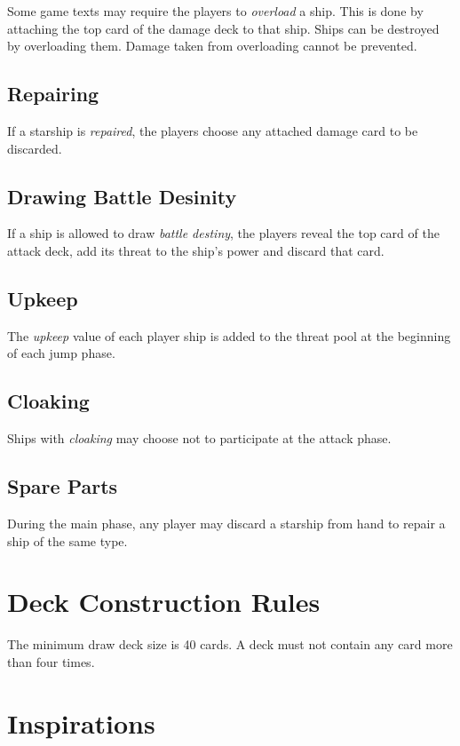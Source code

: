 \documentclass[11pt, a4paper]{article}
\begin{document}
Some game texts may require the players to \emph{overload} a ship. This is done
by attaching the top card of the damage deck to that ship. Ships can be
destroyed by overloading them. Damage taken from overloading cannot be
prevented.

\subsection{Repairing}

If a starship is \emph{repaired}, the players choose any attached damage
card to be discarded.

\subsection{Drawing Battle Desinity}

If a ship is allowed to draw \emph{battle destiny}, the players reveal the top
card of the attack deck, add its threat to the ship's power and discard that
card.

\subsection{Upkeep}

The \emph{upkeep} value of each player ship is added to the threat pool at the
beginning of each jump phase.

\subsection{Cloaking}

Ships with \emph{cloaking} may choose not to participate at the attack phase.

\subsection{Spare Parts}

During the main phase, any player may discard a starship from hand to repair
a ship of the same type.

\section{Deck Construction Rules}

The minimum draw deck size is 40 cards. A deck must not contain any card more
than four times.

\section{Inspirations}
\end{document}
